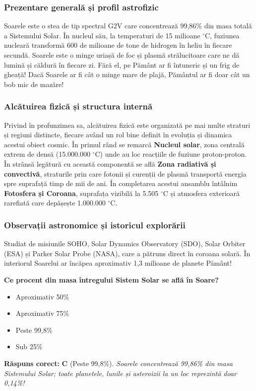 \subsubsection*{Prezentare generală și profil astrofizic}
Soarele este o stea de tip spectral G2V care concentrează 99,86\% din masa totală a Sistemului Solar. În nucleul său, la temperaturi de 15 milioane $^\circ$C, fuziunea nucleară transformă 600 de milioane de tone de hidrogen în heliu în fiecare secundă. Soarele este o minge uriașă de foc și plasmă strălucitoare care ne dă lumină și căldură în fiecare zi. Fără el, pe Pământ ar fi întuneric și un frig de gheață! Dacă Soarele ar fi cât o minge mare de plajă, Pământul ar fi doar cât un bob mic de mazăre!

\subsubsection*{Alcătuirea fizică și structura internă}
Privind în profunzimea sa, alcătuirea fizică este organizată pe mai multe straturi și regiuni distincte, fiecare având un rol bine definit în evoluția și dinamica acestui obiect cosmic. În primul rând se remarcă \textbf{Nucleul solar}, zona centrală extrem de densă (15.000.000 $^\circ$C) unde au loc reacțiile de fuziune proton-proton. În strânsă legătură cu această componentă se află \textbf{Zona radiativă și convectivă}, straturile prin care fotonii și curenții de plasmă transportă energia spre suprafață timp de mii de ani. În completarea acestui ansamblu întâlnim \textbf{Fotosfera și Coroana}, suprafața vizibilă la 5.505 $^\circ$C și atmosfera exterioară rarefiată care depășește 1.000.000 $^\circ$C.

\subsubsection*{Observații astronomice și istoricul explorării}
Studiat de misiunile SOHO, Solar Dynamics Observatory (SDO), Solar Orbiter (ESA) și Parker Solar Probe (NASA), care a pătruns direct în coroana solară. În interiorul Soarelui ar încăpea aproximativ 1,3 milioane de planete Pământ!

\vspace{6pt}
\begin{tcolorbox}[orbitarquiz, title={\textbf{Întrebare de verificare \#1: Soarele}}]
\textbf{Ce procent din masa întregului Sistem Solar se află în Soare?}
\begin{itemize}[leftmargin=2.2em, itemsep=2pt, topsep=4pt]
  \item[$\square$ \textbf{A.}] Aproximativ 50\%
  \item[$\square$ \textbf{B.}] Aproximativ 75\%
  \item[$\square$ \textbf{C.}] Peste 99,8\%
  \item[$\square$ \textbf{D.}] Sub 25\%
\end{itemize}
\vspace{2pt}
{\footnotesize\color{orbitarMuted}\textbf{Răspuns corect:} \textbf{C} (Peste 99,8\%). \emph{Soarele concentrează 99,86\% din masa Sistemului Solar; toate planetele, lunile și asteroizii la un loc reprezintă doar 0,14\%!}}
\end{tcolorbox}
\clearpage


